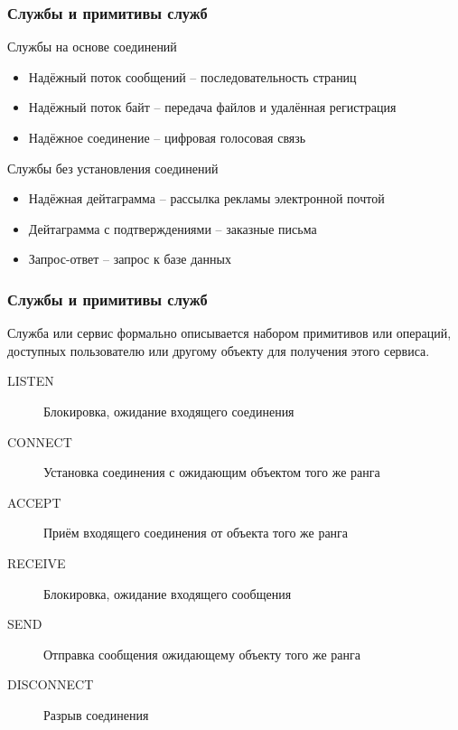 \documentclass[utf8]{beamer}
\begin{document}
\begin{frame}
\frametitle{Службы и примитивы служб}
\begin{block}{Службы на основе соединений}
 \begin{itemize}
  \item Надёжный поток сообщений -- последовательность страниц
  \item Надёжный поток байт -- передача файлов и удалённая регистрация
  \item Надёжное соединение -- цифровая голосовая связь
 \end{itemize}
\end{block}
\begin{block}{Службы без установления соединений}
 \begin{itemize}
  \item Надёжная дейтаграмма -- рассылка рекламы электронной почтой
  \item Дейтаграмма с подтверждениями -- заказные письма
  \item Запрос-ответ -- запрос к базе данных
 \end{itemize}
\end{block}
\end{frame}
\begin{frame}
\frametitle{Службы и примитивы служб}
Служба или сервис формально описывается набором примитивов или операций, доступных пользователю или другому объекту для получения этого сервиса.
\begin{description}
 \item[LISTEN] Блокировка, ожидание входящего соединения
 \item[CONNECT] Установка соединения с ожидающим объектом того же ранга
 \item[ACCEPT] Приём входящего соединения от объекта того же ранга
 \item[RECEIVE] Блокировка, ожидание входящего сообщения
 \item[SEND] Отправка сообщения ожидающему объекту того же ранга
 \item[DISCONNECT] Разрыв соединения
\end{description}
\end{frame}
\end{document}
